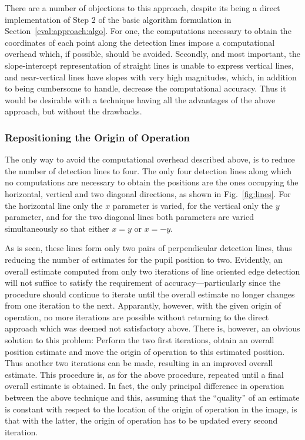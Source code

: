 There are a number of objections to this approach, despite its being a
direct implementation of Step 2 of the basic algorithm formulation in
Section~\ref{eval:approach:algo}.  For one, the computations necessary
to obtain the coordinates of each point along the detection lines
impose a computational overhead which, if possible, should be avoided.
Secondly, and most important, the slope-intercept representation of
straight lines is unable to express vertical lines, and near-vertical
lines have slopes with very high magnitudes, which, in addition to
being cumbersome to handle, decrease the computational accuracy.  Thus
it would be desirable with a technique having all the advantages of
the above approach, but without the drawbacks.

\subsubsection{Repositioning the Origin of Operation}


The only way to avoid the computational overhead described above, is
to reduce the number of detection lines to four.  The only four
detection lines along which no computations are necessary to obtain
the positions are the ones occupying the horizontal, vertical and two
diagonal directions, as shown in Fig.~\ref{fig:lines}.  For the
horizontal line only the $x$ parameter is varied, for the vertical
only the $y$ parameter, and for the two diagonal lines both parameters
are varied simultaneously so that either $x=y$ or $x=-y$.  

As is seen, these lines form only two pairs of perpendicular detection
lines, thus reducing the number of estimates for the pupil position to
two.  Evidently, an overall estimate computed from only two iterations
of line oriented edge detection will not suffice to satisfy the
requirement of accuracy---particularly since the procedure should
continue to iterate until the overall estimate no longer changes from
one iteration to the next.  Apparantly, however, with the given origin
of operation, no more iterations are possible without returning to the
direct approach which was deemed not satisfactory above.  There is,
however, an obvious solution to this problem: Perform the two first
iterations, obtain an overall position estimate and move the origin of
operation to this estimated position.  Thus another two iterations can
be made, resulting in an improved overall estimate.  This procedure
is, as for the above procedure, repeated until a final overall
estimate is obtained.  In fact, the only principal difference in
operation between the above technique and this, assuming that the
``quality'' of an estimate is constant with respect to the location of
the origin of operation in the image, is that with the latter, the
origin of operation has to be updated every second iteration.


